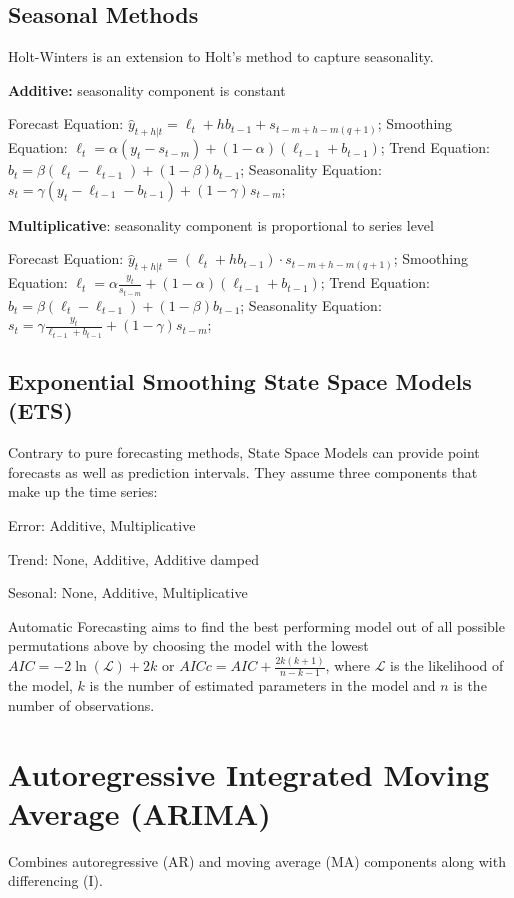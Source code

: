 \subsection{Seasonal Methods}
Holt-Winters is an extension to Holt's method to capture seasonality.

\textbf{Additive:} seasonality component is constant

Forecast Equation: $ \hat{y}_{t+h|t} = \ell_t + hb_{t-1} + s_{t-m+h-m(q+1)} $;
Smoothing Equation: $ \ell_t = \alpha (y_t - s_{t-m}) + (1 - \alpha)(\ell_{t-1} + b_{t-1}) $;
Trend Equation: $ b_t = \beta (\ell_t - \ell_{t-1}) + (1 - \beta) b_{t-1} $;
Seasonality Equation: $ s_t = \gamma (y_t - \ell_{t-1} - b_{t-1}) + (1 - \gamma) s_{t-m} $;

\textbf{Multiplicative}: seasonality component is proportional to series level

Forecast Equation: $ \hat{y}_{t+h|t} = (\ell_t + hb_{t-1}) \cdot s_{t-m+h-m(q+1)} $;
Smoothing Equation: $ \ell_t = \alpha \frac{y_t}{s_{t-m}} + (1 - \alpha)(\ell_{t-1} + b_{t-1}) $;
Trend Equation: $ b_t = \beta (\ell_t - \ell_{t-1}) + (1 - \beta) b_{t-1} $;
Seasonality Equation: $ s_t = \gamma \frac{y_t}{\ell_{t-1} + b_{t-1}} + (1 - \gamma) s_{t-m} $;

\subsection{Exponential Smoothing State Space Models (ETS)}
Contrary to pure forecasting methods, State Space Models can provide point forecasts as well as prediction intervals.
They assume three components that make up the time series:

Error: {Additive, Multiplicative}

Trend: {None, Additive, Additive damped}

Sesonal: {None, Additive, Multiplicative}

\noindent
Automatic Forecasting aims to find the best performing model out of all possible permutations above by choosing
the model with the lowest $ AIC = -2 \ln(\mathcal{L}) + 2k $ or $ AICc = AIC + \frac{2k(k+1)}{n-k-1} $,
where $ \mathcal{L} $ is the likelihood of the model, $ k $ is the number of estimated parameters in the model and $ n $ is the number of observations.

\section{Autoregressive Integrated Moving Average (ARIMA)}
Combines autoregressive (AR) and moving average (MA) components along with differencing (I).

